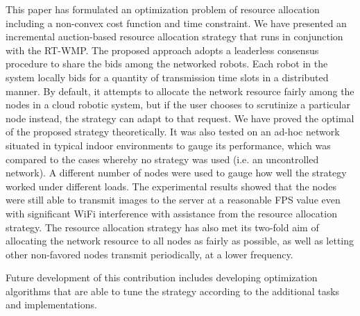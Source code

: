 \documentclass[journal]{IEEEtran}  %
\begin{document}
This paper has formulated an optimization problem of resource allocation
including a non-convex cost function and time constraint.
We have presented an incremental auction-based resource allocation strategy
that runs in conjunction with the RT-WMP.
The proposed approach adopts a leaderless consensus procedure to share the bids
among the networked robots. 
Each robot in the system locally bids for a quantity of transmission time slots
in a distributed manner. 
By default, it attempts to allocate the network resource fairly among the nodes
in a cloud robotic system, but if the user chooses to scrutinize a particular
node instead, the strategy can adapt to that request.
We have proved the optimal of the proposed strategy theoretically. 
It was also tested on an ad-hoc network situated in typical indoor environments
to gauge its performance, which was compared to the cases whereby no strategy
was used (i.e. an uncontrolled network).
A different number of nodes were used to gauge how well the strategy worked
under different loads. The experimental results showed that the nodes were
still able to transmit images to the server at a reasonable FPS value even with
significant WiFi interference with assistance from the resource
allocation strategy.
The resource allocation strategy has also met its two-fold
aim of allocating the network resource to all nodes as fairly as possible, as
well as letting other non-favored nodes transmit periodically, at a lower
frequency. 

Future development of this contribution includes developing optimization 
algorithms that are able to tune the strategy according to the additional 
tasks and implementations.




%
\end{document}
